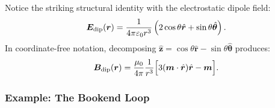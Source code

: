 Notice the striking structural identity with the electrostatic dipole field:
\begin{equation}
    \bm{E}_{\text{dip}}(\bm{r}) = \frac{1}{4\pi\varepsilon_0 r^3}\left(2\cos\theta \hat{\bm{r}} + \sin\theta \hat{\bm{\theta}}\right).
\end{equation}
In coordinate-free notation, decomposing $\hat{\bm{z}} = \cos\theta \hat{\bm{r}} - \sin\theta \hat{\bm{\theta}}$ produces:
\begin{equation}
    \bm{B}_{\text{dip}}(\bm{r}) = \frac{\mu_0}{4\pi} \frac{1}{r^3} \Big[ 3(\bm{m}\cdot \hat{\bm{r}})\hat{\bm{r}} - \bm{m} \Big].
    \label{eq:B_dip_coord_free}
\end{equation}

\subsubsection{Example: The Bookend Loop}

